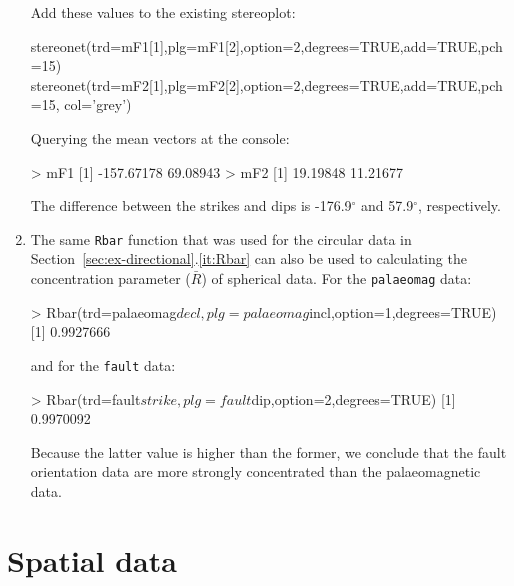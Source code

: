 \begin{enumerate}
Add these values to the existing stereoplot:

\begin{script}[firstnumber=8]
stereonet(trd=mF1[1],plg=mF1[2],option=2,degrees=TRUE,add=TRUE,pch=15)
stereonet(trd=mF2[1],plg=mF2[2],option=2,degrees=TRUE,add=TRUE,pch=15,
          col='grey')
\end{script}

Querying the mean vectors at the console:

\begin{console}
> mF1
[1] -157.67178   69.08943
> mF2
[1] 19.19848 11.21677
\end{console}

The difference between the strikes and dips is -176.9$^\circ$ and
57.9$^\circ$, respectively.

\item The same \texttt{Rbar} function that was used for the circular
  data in Section~\ref{sec:ex-directional}.\ref{it:Rbar} can also be
  used to calculating the concentration parameter ($\bar{R}$) of
  spherical data. For the \texttt{palaeomag} data:

\begin{console}  
> Rbar(trd=palaeomag$decl,plg=palaeomag$incl,option=1,degrees=TRUE)
[1] 0.9927666
\end{console}

\noindent and for the \texttt{fault} data:

\begin{console}  
> Rbar(trd=fault$strike,plg=fault$dip,option=2,degrees=TRUE)
[1] 0.9970092
\end{console}

Because the latter value is higher than the former, we conclude that
the fault orientation data are more strongly concentrated than the
palaeomagnetic data.

\end{enumerate}

\section{Spatial data}
\label{sec:sol-spatial}

